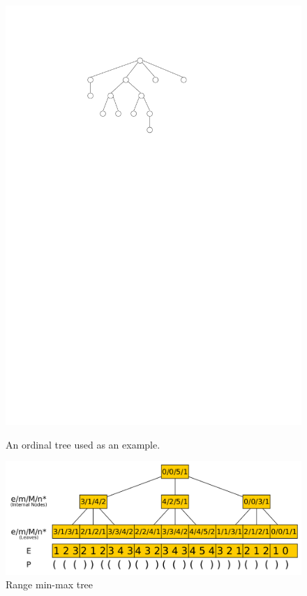 \begin{figure}[t]
  \centering
  \begin{minipage}{.38\textwidth}
  \centering
  \includegraphics[scale=0.5]{images/bp.pdf}
  \caption{An ordinal tree used as an example.}
  \label{figure:bp}
\end{minipage}%
\hspace{2mm}
  \begin{minipage}{.58\textwidth}
  \centering
  \includegraphics[scale=0.16]{./images/Range-min-max-tree.png}
  \caption{Range min-max tree}
  \label{fig:RangeMinMaxTree} 
\end{minipage}
\end{figure}

